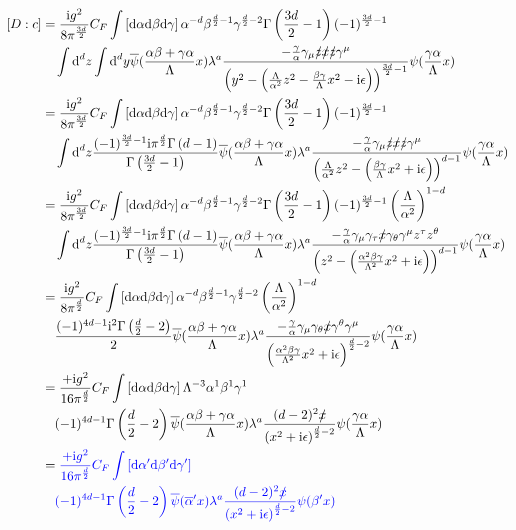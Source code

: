 \begin{align}
	\left[D:c\right]
	&=
	\frac{\text{i} g^2}{8\pi^{\frac{3d}{2}}} C_F \int\left[\text{d} \alpha \text{d} \beta \text{d} \gamma\right]\alpha^{-d}\beta^{\frac{d}{2}-1}\gamma^{\frac{d}{2}-2}\Gamma\left(\frac{3d}{2}-1\right) (-1)^{\frac{3d}{2}-1}
	\\&~~~
	\int \text{d}^d z \int \text{d}^d y \overline\psi(\frac{\alpha \beta + \gamma \alpha}{\Lambda} x) \lambda^a \frac{ - \frac{\gamma}{\alpha}\gamma_\mu \slashed z \slashed x \slashed z\gamma^\mu }{\left( y^2 - \left( \frac{\Lambda}{\alpha^2}z^2- \frac{\beta\gamma}{\Lambda}x^2-\text{i} \epsilon\right)\right)^{\frac{3d}{2}-1}}\psi(\frac{\gamma \alpha}{\Lambda} x)
	\\
	&=
	\frac{\text{i} g^2}{8\pi^{\frac{3d}{2}}} C_F \int\left[\text{d} \alpha \text{d} \beta \text{d} \gamma\right]\alpha^{-d}\beta^{\frac{d}{2}-1}\gamma^{\frac{d}{2}-2}\Gamma\left(\frac{3d}{2}-1\right) (-1)^{\frac{3d}{2}-1}
	\\&~~~
	\int \text{d}^d z \frac{(-1)^{\frac{3d}{2}-1}\text{i} \pi^{\frac{d}{2}}\Gamma\left(d-1\right)}{\Gamma\left(\frac{3d}{2}-1\right)}\overline\psi(\frac{\alpha \beta + \gamma \alpha}{\Lambda} x) \lambda^a \frac{ - \frac{\gamma}{\alpha}\gamma_\mu \slashed z \slashed x \slashed z\gamma^\mu }{\left(\frac{\Lambda}{\alpha^2}z^2- \left(\frac{\beta\gamma}{\Lambda}x^2+\text{i} \epsilon\right)\right)^{d-1}}\psi(\frac{\gamma \alpha}{\Lambda} x)
	\\
	&=
	\frac{\text{i} g^2}{8\pi^{\frac{3d}{2}}} C_F \int\left[\text{d} \alpha \text{d} \beta \text{d} \gamma\right]\alpha^{-d}\beta^{\frac{d}{2}-1}\gamma^{\frac{d}{2}-2}\Gamma\left(\frac{3d}{2}-1\right) (-1)^{\frac{3d}{2}-1}\left(\frac{\Lambda}{\alpha^2}\right)^{1-d}
	\\&~~~
	\int \text{d}^d z \frac{(-1)^{\frac{3d}{2}-1}\text{i} \pi^{\frac{d}{2}}\Gamma\left(d-1\right)}{\Gamma\left(\frac{3d}{2}-1\right)}\overline\psi(\frac{\alpha \beta + \gamma \alpha}{\Lambda} x) \lambda^a \frac{ - \frac{\gamma}{\alpha}\gamma_\mu \gamma_\tau \slashed x \gamma_\theta \gamma^\mu z^\tau z^\theta }{\left(z^2- \left(\frac{\alpha^2\beta\gamma}{\Lambda^2}x^2+\text{i} \epsilon\right)\right)^{d-1}}\psi(\frac{\gamma \alpha}{\Lambda} x)
	\\
	&=
	\frac{\text{i} g^2}{8\pi^{\frac{d}{2}}} C_F \int\left[\text{d} \alpha \text{d} \beta \text{d} \gamma\right]\alpha^{-d}\beta^{\frac{d}{2}-1}\gamma^{\frac{d}{2}-2} \left(\frac{\Lambda}{\alpha^2}\right)^{1-d}
	\\&~~~
	\frac{(-1)^{4d-1}\text{i}^2\Gamma\left(\frac{d}{2}-2\right)}{2}\overline\psi(\frac{\alpha \beta + \gamma \alpha}{\Lambda} x) \lambda^a \frac{ - \frac{\gamma}{\alpha}\gamma_\mu \gamma_\theta \slashed x \gamma^\theta \gamma^\mu }{\left(\frac{\alpha^2\beta\gamma}{\Lambda^2}x^2+\text{i} \epsilon\right)^{\frac{d}{2}-2}}\psi(\frac{\gamma \alpha}{\Lambda} x)
	\\
	&=
	\frac{+\text{i} g^2}{16\pi^{\frac{d}{2}}} C_F \int\left[\text{d} \alpha \text{d} \beta \text{d} \gamma\right]\Lambda^{-3}\alpha^{1}\beta^{1}\gamma^{1}
	\\&~~~
	(-1)^{4d-1}\Gamma\left(\frac{d}{2}-2\right)\overline\psi(\frac{\alpha \beta + \gamma \alpha}{\Lambda} x) \lambda^a \frac{ (d-2)^2\slashed x }{\left(x^2+\text{i} \epsilon\right)^{\frac{d}{2}-2}}\psi(\frac{\gamma \alpha}{\Lambda} x)
	\\
	&=
	\color{blue}
	\frac{+\text{i} g^2}{16\pi^{\frac{d}{2}}} C_F \int\left[\text{d} \alpha' \text{d} \beta' \text{d} \gamma'\right] 
	\\&~~~\color{blue}
	(-1)^{4d-1}\Gamma\left(\frac{d}{2}-2\right)\overline\psi(\overline\alpha' x) \lambda^a \frac{ (d-2)^2\slashed x }{\left(x^2+\text{i} \epsilon\right)^{\frac{d}{2}-2}}\psi(\beta' x)
\end{align}
